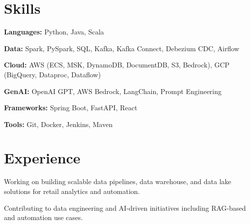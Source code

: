 \documentclass[letterpaper,10pt]{article}
\begin{document}

\section{Skills}
\begin{itemize}[leftmargin=0.15in, label={}, itemsep=-2pt]
{
    \item{\textbf{Languages:} Python, Java, Scala}
    \item{\textbf{Data:} Spark, PySpark, SQL, Kafka, Kafka Connect, Debezium CDC, Airflow}
    \item{\textbf{Cloud:} AWS (ECS, MSK, DynamoDB, DocumentDB, S3, Bedrock), GCP (BigQuery, Dataproc, Dataflow)}
    \item{\textbf{GenAI:} OpenAI GPT, AWS Bedrock, LangChain, Prompt Engineering}
    \item{\textbf{Frameworks:} Spring Boot, FastAPI, React}
    \item{\textbf{Tools:} Git, Docker, Jenkins, Maven}
}
\end{itemize}

\vspace{5pt}

\section{Experience}

\begin{resume_list}
    \item Working on building scalable data pipelines, data warehouse, and data lake solutions for retail analytics and automation.
    \item Contributing to data engineering and AI-driven initiatives including RAG-based and automation use cases.
\end{resume_list}
\end{document}
